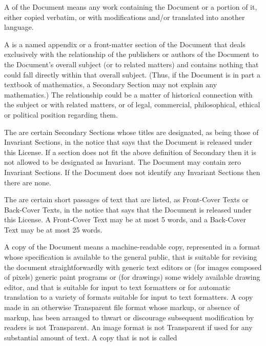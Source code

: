 A  of the Document means any work
containing the Document or a portion of it, either copied
verbatim, or with modifications and/or translated into
another language.

A  is a named appendix or a
front-matter section of the Document that deals exclusively
with the relationship of the publishers or authors of the
Document to the Document\textquoteright s overall subject (or to related
matters) and contains nothing that could fall directly
within that overall subject. (Thus, if the Document is in
part a textbook of mathematics, a Secondary Section may not
explain any mathematics.) The relationship could be a matter
of historical connection with the subject or with related
matters, or of legal, commercial, philosophical, ethical or
political position regarding them.

The  are certain Secondary Sections
whose titles are designated, as being those of Invariant
Sections, in the notice that says that the Document is
released under this License. If a section does not fit the
above definition of Secondary then it is not allowed to
be designated as Invariant. The Document may contain zero
Invariant Sections. If the Document does not identify any
Invariant Sections then there are none.

The  are certain short passages of text
that are listed, as Front-Cover Texts or Back-Cover Texts,
in the notice that says that the Document is released under
this License. A Front-Cover Text may be at most 5 words,
and a Back-Cover Text may be at most 25 words.

A  copy of the Document means a
machine-readable copy, represented in a format whose
specification is available to the general public, that is
suitable for revising the document straightforwardly with
generic text editors or (for images composed of pixels)
generic paint programs or (for drawings) some widely
available drawing editor, and that is suitable for input to
text formatters or for automatic translation to a variety of
formats suitable for input to text formatters. A copy made in
an otherwise Transparent file format whose markup, or absence
of markup, has been arranged to thwart or discourage subsequent
modification by readers is not Transparent. An image format is
not Transparent if used for any substantial amount of text. A
copy that is not  is called 

